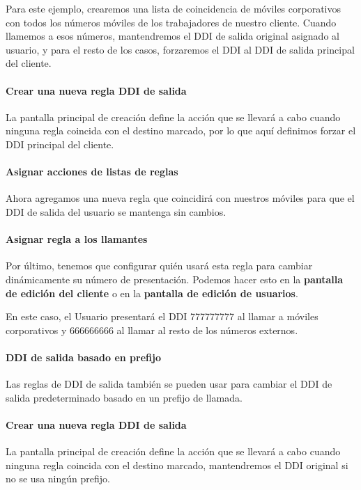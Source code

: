 \documentclass[letterpaper,10pt,spanish]{sphinxmanual}
\begin{document}
Para este ejemplo, crearemos una lista de coincidencia de móviles corporativos con todos los números móviles de los trabajadores de nuestro cliente. Cuando llamemos a esos números, mantendremos el DDI de salida original asignado al usuario, y para el resto de los casos, forzaremos el DDI al DDI de salida principal del cliente.
\paragraph{Crear una nueva regla DDI de salida}

La pantalla principal de creación define la acción que se llevará a cabo cuando ninguna regla coincida con el destino marcado, por lo que aquí definimos forzar el DDI principal del cliente.
\paragraph{Asignar acciones de listas de reglas}

Ahora agregamos una nueva regla que coincidirá con nuestros móviles para que el DDI de salida del usuario se mantenga sin cambios.
\paragraph{Asignar regla a los llamantes}

Por último, tenemos que configurar quién usará esta regla para cambiar dinámicamente su número de presentación. Podemos hacer esto en la \textbf{pantalla de edición del cliente} o en la \textbf{pantalla de edición de usuarios}.

En este caso, el Usuario presentará el DDI 777777777 al llamar a móviles corporativos y 666666666 al llamar al resto de los números externos.


\paragraph{DDI de salida basado en prefijo}
\label{administration_portal/client/vpbx/user_configuration/outgoing_ddi_rules:outgoing-ddi-based-on-prefix}
Las reglas de DDI de salida también se pueden usar para cambiar el DDI de salida predeterminado basado en un prefijo de llamada.
\paragraph{Crear una nueva regla DDI de salida}

La pantalla principal de creación define la acción que se llevará a cabo cuando ninguna regla coincida con el destino marcado, mantendremos el DDI original si no se usa ningún prefijo.
\end{document}
